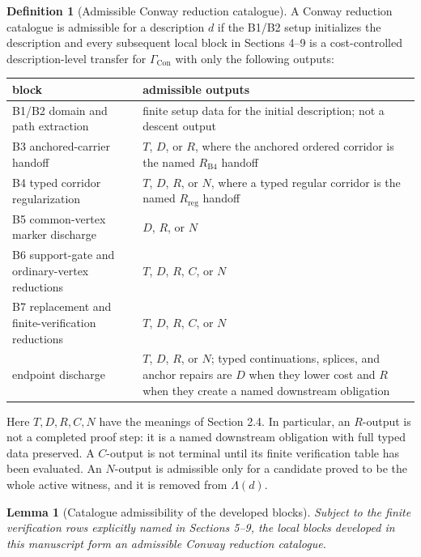 \documentclass[11pt]{amsart}
\newtheorem{lemma}[theorem]{Lemma}
\theoremstyle{definition}
\newtheorem{definition}[theorem]{Definition}
\begin{document}
\begin{definition}[Admissible Conway reduction catalogue]
A Conway reduction
catalogue is admissible for a description \(d\) if the B1/B2 setup initializes
the description and every subsequent local block in Sections 4--9 is a
cost-controlled description-level transfer for \(\Gamma_{\mathrm{Con}}\) with only
the following outputs:

\begin{center}
\begin{tabular}{p{}p{}}
block & admissible outputs \\ \hline
B1/B2 domain and path extraction & finite setup data for the initial description; not a descent output \\
B3 anchored-carrier handoff & \(T\), \(D\), or \(R\), where the anchored ordered corridor is the named \(R_{\mathrm{B4}}\) handoff \\
B4 typed corridor regularization & \(T\), \(D\), \(R\), or \(N\), where a typed regular corridor is the named \(R_{\mathrm{reg}}\) handoff \\
B5 common-vertex marker discharge & \(D\), \(R\), or \(N\) \\
B6 support-gate and ordinary-vertex reductions & \(T\), \(D\), \(R\), \(C\), or \(N\) \\
B7 replacement and finite-verification reductions & \(T\), \(D\), \(R\), \(C\), or \(N\) \\
endpoint discharge & \(T\), \(D\), \(R\), or \(N\); typed continuations, splices, and anchor repairs are \(D\) when they lower cost and \(R\) when they create a named downstream obligation \\
\end{tabular}
\end{center}

Here \(T,D,R,C,N\) have the meanings of Section 2.4. In particular, an \(R\)-output
is not a completed proof step: it is a named downstream obligation with full
typed data preserved. A \(C\)-output is not terminal until its finite verification
table has been evaluated. An \(N\)-output is admissible only for a candidate proved
to be the whole active witness, and it is removed from \(\Lambda(d)\).

\end{definition}
\begin{lemma}[Catalogue admissibility of the developed blocks]
Subject to the
finite verification rows explicitly named in Sections 5--9, the local blocks
developed in this manuscript form an admissible Conway reduction catalogue.

\end{lemma}
\end{document}
